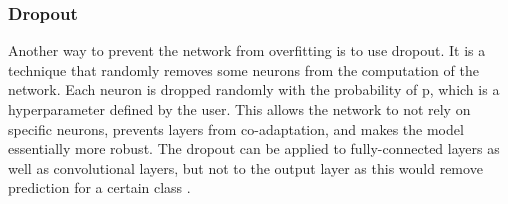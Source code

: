\subsubsection{Dropout}
Another way to prevent the network from overfitting is to use dropout. It is a technique that randomly removes some neurons from the computation of the network. Each neuron is dropped randomly with the probability of p, which is a hyperparameter defined by the user. This allows the network to not rely on specific neurons, prevents layers from co-adaptation, and makes the model essentially more robust. The dropout can be applied to fully-connected layers as well as convolutional layers, but not to the output layer as this would remove prediction for a certain class \cite{standford}.

